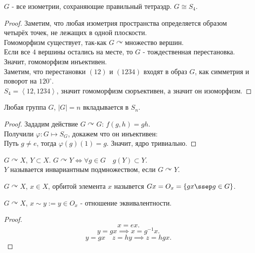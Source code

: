 \documentclass[11pt, oneside]{article}   	%
\newcommand{\actson}{\curvearrowright}
\begin{document}
    \begin{tlemma}
        $G$ - все изометрии, сохраняющие правильный тетраэдр. $G \cong S_4$.
        \begin{proof}
            Заметим, что любая изометрия пространства определяется образом четырёх точек, не лежащих в одной плоскости.\\
            Гомоморфизм существует, так-как $G\actson \text{множество вершин}$.\\
            Если все $4$ вершины остались на месте, то $G$ - тождественная перестановка. Значит, гомоморфизм инъективен.\\
            Заметим, что перестановки $(12)$ и $(1234)$ входят в образ $G$, как симметрия и поворот на $120^{\circ}$.\\
            $S_4 = \left<12, 1234\right>$, значит гомоморфизм сюръективен, а значит он изоморфизм.
        \end{proof}
    \end{tlemma}
    \begin{tlemma}
        Любая группа $G$, $|G| = n$ вкладывается в $S_n$.\\
        \begin{proof}
            Зададим действие $G\actson G$: $f(g, h) = gh$.\\
            Получили $\varphi : G \mapsto S_G$, докажем что он инъективен:\\
            Путь $g \neq e$, тогда $\varphi(g)(1) = g$. Значит, ядро тривиально. 
        \end{proof}
    \end{tlemma}
    \begin{theorem}
        $G\actson X$,  $Y \subset X$. $G\actson Y \iff \forall{g\in G}\quad g(Y) \subset Y$.\\
        $Y$ называется инвариантным подмножеством, если $G\actson Y$.
    \end{theorem}
    \begin{definition}
        $G\actson X$,  $x\in X$, орбитой элемента $x$ назывется $Gx = O_{x} = \{gx \ssep g\in G\} $.
    \end{definition}
    \begin{dlemma}
        $G\actson X$, $x\sim y := y\in O_x$ - отношение эквивалентности.
        \begin{proof}
            \[ x = ex .\]
            \[ y=gx \implies x = g^{-1}x .\]
            \[ y=gx\quad z=hy \implies z = hgx .\] 
        \end{proof}
    \end{dlemma}
\end{document}

